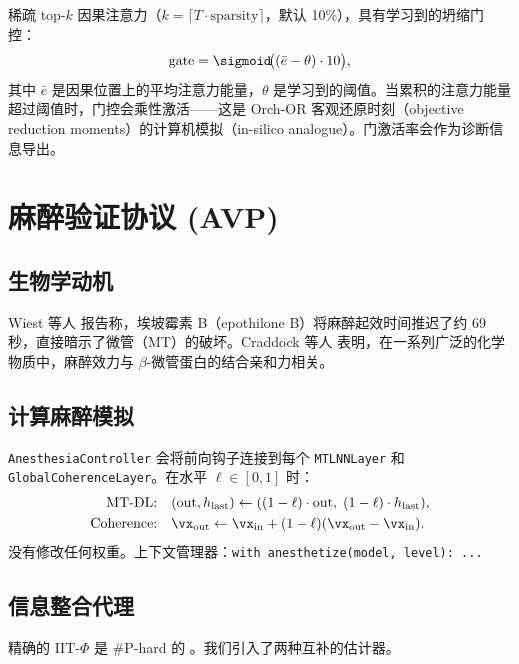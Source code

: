 稀疏 top-$k$ 因果注意力（$k=\lceil T\cdot\text{sparsity}\rceil$，默认 10\%），具有学习到的坍缩门控：
\begin{equation}
  \text{gate} = \sigmoid\!\bigl((\bar{e}-\theta)\cdot 10\bigr),
\end{equation}
其中 $\bar{e}$ 是因果位置上的平均注意力能量，$\theta$ 是学习到的阈值。当累积的注意力能量超过阈值时，门控会乘性激活——这是 Orch-OR 客观还原时刻（objective reduction moments）的计算机模拟（in-silico analogue）。门激活率会作为诊断信息导出。

\section{麻醉验证协议 (AVP)}
\label{sec:avp}

\subsection{生物学动机}
Wiest 等人 \citep{wiest2025quantum} 报告称，埃坡霉素 B（epothilone B）将麻醉起效时间推迟了约 69 秒，直接暗示了微管（MT）的破坏。Craddock 等人 \citep{craddock2017anesthetic} 表明，在一系列广泛的化学物质中，麻醉效力与 $\beta$-微管蛋白的结合亲和力相关。

\subsection{计算麻醉模拟}
\texttt{AnesthesiaController} 会将前向钩子连接到每个 \texttt{MTLNNLayer} 和 \texttt{GlobalCoherenceLayer}。在水平 $\ell\in[0,1]$ 时：
\begin{align}
  \text{MT-DL:}& \quad (\text{out}, h_\text{last}) \leftarrow ((1-\ell)\cdot\text{out},\;(1-\ell)\cdot h_\text{last}), \\
  \text{Coherence:}& \quad \vx_\text{out} \leftarrow \vx_\text{in} + (1-\ell)(\vx_\text{out}-\vx_\text{in}).
\end{align}
没有修改任何权重。上下文管理器：\texttt{with anesthetize(model, level): ...}

\subsection{信息整合代理}
\label{sec:proxies}
精确的 IIT-$\Phi$ 是 \#P-hard 的 \citep{aaronson2014why}。我们引入了两种互补的估计器。

